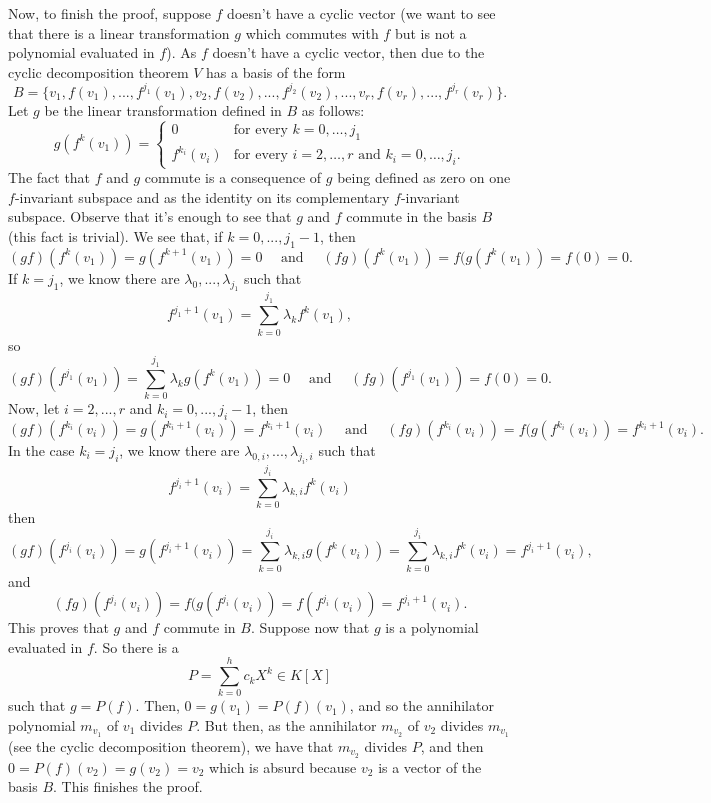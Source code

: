 \documentclass[12pt]{article}
\begin{document}
Now, to finish the proof, suppose $f$ doesn't have a cyclic vector (we want to see that there is a linear transformation $g$ which commutes with $f$ but is not a polynomial evaluated in $f$). As $f$ doesn't have a cyclic vector, then due to the cyclic decomposition theorem $V$ has a basis of the form 
$$B=\{v_{1}, f(v_{1}),...,f^{j_{1}}(v_{1}),v_{2},f(v_{2}),..., f^{j_{2}}(v_{2}),...,v_{r},f(v_{r}),...,f^{j_{r}}(v_{r})\}.$$ 
Let $g$ be the linear transformation defined in $B$ as follows:
\begin{displaymath}
g(f^{k}(v_{1}))= \left\{
\begin{array}{ll}
0 & \textrm{for every } k=0,\ldots,j_1\\
f^{k_{i}}(v_{i}) & \textrm{for every } i=2,\ldots,r\textrm{ and }k_{i}=0,\ldots,j_{i}. 
\end{array}
\right.
\end{displaymath}
The fact that $f$ and $g$ commute is a consequence of $g$ being defined as zero on one $f$-invariant subspace and as the identity on its complementary $f$-invariant subspace.  Observe that it's enough to see that $g$ and $f$ commute in the basis $B$ (this fact is trivial). We see that, if $k=0,...,j_{1}-1$, then 
$$(gf)(f^{k}(v_{1}))=g(f^{k+1}(v_{1}))=0\quad \mbox{ and }\quad(fg)(f^{k}(v_{1}))=f(g(f^{k}(v_{1}))=f(0)=0.$$ 
If $k=j_{1}$, we know there are $\lambda_{0},...,\lambda_{j_{1}}$ such that $$f^{j_{1}+1}(v_{1})=\sum_{k=0}^{j_{1}}\lambda_{k}f^{k}(v_{1}),$$ so $$(gf)(f^{j_{1}}(v_{1}))=\sum_{k=0}^{j_{1}}\lambda_{k}g(f^{k}(v_{1}))=0\quad\mbox{ and }\quad(fg)(f^{j_{1}}(v_{1}))=f(0)=0.$$ 
Now, let $i=2,...,r$ and $k_{i}=0,...,j_{i}-1$, then 
$$(gf)(f^{k_{i}}(v_{i}))=g(f^{k_{i}+1}(v_{i}))=f^{k_{i}+1}(v_{i})\quad\mbox{ and }\quad (fg)(f^{k_{i}}(v_{i})) =f(g(f^{k_{i}}(v_{i}))= f^{k_{i}+1}(v_{i}).$$ 
In the case $k_{i}=j_{i}$, we know there are $\lambda_{0,i},...,\lambda_{j_{i},i}$ such that $$f^{j_{i}+1}(v_{i})=\sum_{k=0}^{j_{i}}\lambda_{k,i}f^{k}(v_{i})$$ then $$(gf)(f^{j_{i}}(v_{i}))=g(f^{j_{i}+1}(v_{i}))=\sum_{k=0}^{j_{i}}\lambda_{k,i}g(f^{k}(v_{i}))= \sum_{k=0}^{j_{i}}\lambda_{k,i}f^{k}(v_{i})=f^{j_{i}+1}(v_{i}),$$ and $$(fg)(f^{j_{i}}(v_{i}))=f(g(f^{j_{i}}(v_{i}))=f(f^{j_{i}}(v_{i}))=f^{j_{i}+1}(v_{i}).$$ This proves that $g$ and $f$ commute in $B$. Suppose now that $g$ is a polynomial evaluated in $f$. So there is a $$P=\sum_{k=0}^{h}c_{k}X^{k} \in K[X]$$ such that
$g=P(f)$. Then, $0=g(v_{1})=P(f)(v_{1})$, and so the annihilator polynomial $m_{v_{1}}$ of $v_{1}$ divides $P$. But then, as the annihilator $m_{v_{2}}$ of $v_{2}$ divides $m_{v_{1}}$ (see the cyclic decomposition theorem), we have that $m_{v_{2}}$ divides $P$, and then $0=P(f)(v_{2})=g(v_{2})=v_{2}$ which is absurd because $v_{2}$ is a vector of the basis $B$. This finishes the proof.
\end{document}
